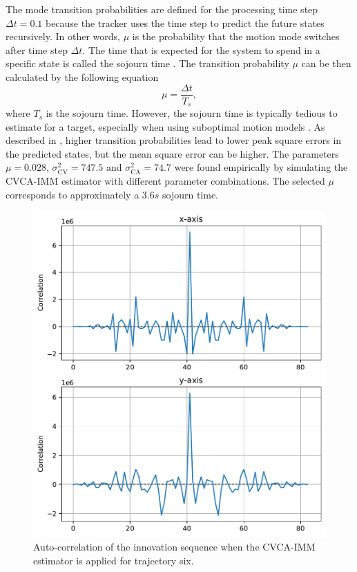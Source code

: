 \documentclass[english, 12pt, a4paper, elec, utf8, a-1b, online]{aaltothesis}
\numberwithin{equation}{section}
\newcommand{\varcv}{\sigma_\text{CV}^2}
\newcommand{\varca}{\sigma_\text{CA}^2}
\newcommand{\msp}{\mu}
\newcommand{\dt}{\Delta t}
\begin{document}
The mode transition probabilities are defined for the processing time step $\dt=0.1$ because the tracker uses the time step to predict the future states recursively.
In other words, $\msp$ is the probability that the motion mode switches after time step $\dt$.
The time that is expected for the system to spend in a specific state is called the sojourn time \cite{Simeonova2002}.
The transition probability $\msp$ can be then calculated by the following equation
\begin{equation}
   \msp = \frac{\dt}{T_s},
\end{equation}
where $T_s$ is the sojourn time.
However, the sojourn time is typically tedious to estimate for a target, especially when using suboptimal motion models \cite{Simeonova2002}.
As described in \cite{Simeonova2002}, higher transition probabilities lead to lower peak square errors in the predicted states, but the mean square error can be higher.
The parameters $\msp=0.028$, $\varcv=747.5$ and $\varca=74.7$ were found empirically by simulating the CVCA-IMM estimator with different parameter combinations.
The selected $\msp$ corresponds to approximately a $3.6s$ sojourn time.

\begin{figure}[bt]
    \centering
    \includegraphics[width=0.8\linewidth]{figures/benchmark/IMM/correlation_imm.pdf}
    \caption{Auto-correlation of the innovation sequence when the CVCA-IMM estimator is applied for trajectory six.}
    \label{fig:auto_correlation}
\end{figure}
\end{document}
